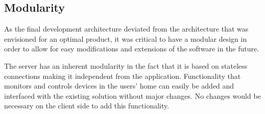 \subsection{Modularity}
\label{sec:modularity}
As the final development architecture deviated from the architecture that was envisioned for an optimal product, it was critical to have a modular design in order to allow for easy modifications and extensions of the software in the future. 

The server has an inherent modularity in the fact that it is based on stateless connections making it independent from the application. Functionality that monitors and controls devices in the users' home can easily be added and interfaced with the existing solution without major changes. No changes would be necessary on the client side to add this functionality.
